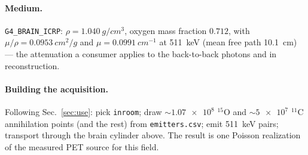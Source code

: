 \documentclass[11pt]{article}
\newcommand{\file}[1]{\texttt{#1}}
\begin{document}
\paragraph{Medium.} \file{G4\_BRAIN\_ICRP}: $\rho=\SI{1.040}{g/cm^3}$, oxygen
mass fraction $0.712$, with $\mu/\rho=\SI{0.0953}{cm^2/g}$ and
$\mu=\SI{0.0991}{cm^{-1}}$ at \SI{511}{keV} (mean free path \SI{10.1}{cm}) ---
the attenuation a consumer applies to the back-to-back photons and in
reconstruction.

\paragraph{Building the acquisition.} Following Sec.~\ref{sec:use}: pick
\file{inroom}; draw $\sim\num{1.07e8}$ $^{15}$O and $\sim\num{5e7}$ $^{11}$C
annihilation points (and the rest) from \file{emitters.csv}; emit \SI{511}{keV}
pairs; transport through the brain cylinder above. The result is one Poisson
realization of the measured PET source for this field.
\end{document}
